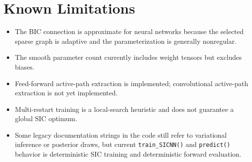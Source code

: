 \documentclass{article}
\begin{document}
\section{Known Limitations}
\begin{itemize}
    \item The BIC connection is approximate for neural networks because the selected sparse graph is adaptive and the parameterization is generally nonregular.
    \item The smooth parameter count currently includes weight tensors but excludes biases.
    \item Feed-forward active-path extraction is implemented; convolutional active-path extraction is not yet implemented.
    \item Multi-restart training is a local-search heuristic and does not guarantee a global SIC optimum.
    \item Some legacy documentation strings in the code still refer to variational inference or posterior draws, but current \texttt{train\_SICNN()} and \texttt{predict()} behavior is deterministic SIC training and deterministic forward evaluation.
\end{itemize}
\end{document}
